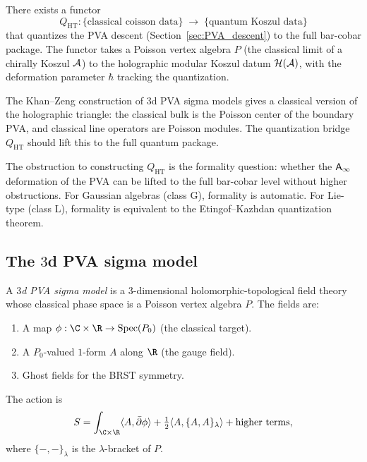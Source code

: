\begin{conjecture}
There exists a functor
\begin{equation}%
Q_{\mathrm{HT}}: \{\text{classical coisson data}\}
\;\longrightarrow\;
\{\text{quantum Koszul data}\}
\end{equation}
that quantizes the PVA descent (Section~\ref{sec:PVA_descent}) to the
full bar-cobar package. The functor takes a Poisson vertex algebra
$P$ (the classical limit of a chirally Koszul $\mathcal{A}$) to the holographic
modular Koszul datum $\mathcal{H}(\mathcal{A})$, with the deformation parameter
$\hbar$ tracking the quantization.
\end{conjecture}

\begin{remark}
The Khan--Zeng construction of 3d PVA sigma models gives a classical
version of the holographic triangle: the classical bulk is the Poisson
center of the boundary PVA, and classical line operators are Poisson
modules. The quantization bridge $Q_{\mathrm{HT}}$ should lift this
to the full quantum package.

The obstruction to constructing $Q_{\mathrm{HT}}$ is the formality
question: whether the $\mathsf{A}_{\infty}$ deformation of the PVA can be lifted
to the full bar-cobar level without higher obstructions. For
Gaussian algebras (class G), formality is automatic. For Lie-type
(class L), formality is equivalent to the Etingof--Kazhdan
quantization theorem.
\end{remark}


\subsection{The $3$d PVA sigma model}

\begin{definition}
A \emph{$3$d PVA sigma model} is a $3$-dimensional
holomorphic-topological field theory whose classical phase space
is a Poisson vertex algebra $P$. The fields are:
\begin{enumerate}[label=\textup{(\roman*)}]
\item A map $\phi: \C \times \R \to \Spec(P_0)$ (the classical
 target).
\item A $P_0$-valued $1$-form $A$ along $\R$ (the gauge field).
\item Ghost fields for the BRST symmetry.
\end{enumerate}
The action is
\begin{equation}%
S = \int_{\C \times \R}
\langle A, \bar\partial\phi \rangle
+ \tfrac{1}{2}\langle A, \{A, A\}_\lambda \rangle
+ \text{higher terms},
\end{equation}
where $\{-,-\}_\lambda$ is the $\lambda$-bracket of $P$.
\end{definition}

